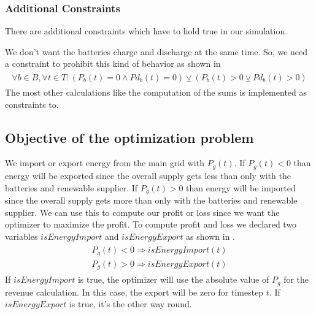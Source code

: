 \subsubsection{Additional Constraints}
There are additional constraints which have to hold true in our simulation.

We don't want the batteries charge and discharge at the same time.
So, we need a constraint to prohibit this kind of behavior as shown in 
\begin{align} \label{eq:batteryConstraint}
\begin{split}
\forall b \in B, \forall t \in T: (P_{b}(t) = 0 \wedge Pd_{b}(t) = 0) \veebar (P_{b}(t)>0 \veebar Pd_{b}(t)>0)
\end{split}
\end{align}
The most other calculations like the computation of the sums is implemented as constraints to.

\subsection{Objective of the optimization problem}
We import or export energy from the main grid with $P_{g}(t)$.
If $P_{g}(t) < 0$ than energy will be exported since the overall supply gets less than only with the batteries and renewable supplier.
If $P_{g}(t) > 0$ than energy will be imported since the overall supply gets more than only with the batteries and renewable supplier.
We can use this to compute our profit or loss since we want the optimizer to maximize the profit.
To compute profit and loss we declared two variables $isEnergyImport$ and $isEnergyExport$ as shown in .
\begin{align} \label{eq:importexport}
\begin{split}
P_{g}(t) < 0 \Rightarrow isEnergyImport(t)\\
P_{g}(t) > 0 \Rightarrow isEnergyExport(t)
\end{split}
\end{align}
If $isEnergyImport$ is true, the optimizer will use the absolute value of $P_{g}$ for the revenue calculation.
In this case, the export will be zero for timestep $t$.
If $isEnergyExport$ is true, it's the other way round.


